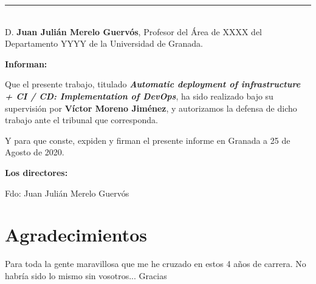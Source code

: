 \noindent\rule[-1ex]{\textwidth}{2pt}\\[4.5ex]

D. \textbf{Juan Julián Merelo Guervós}, Profesor del Área de XXXX del Departamento YYYY de la Universidad de Granada.


\vspace{0.5cm}

\textbf{Informan:}

\vspace{0.5cm}

Que el presente trabajo, titulado \textit{\textbf{Automatic deployment of infrastructure + CI / CD: Implementation of DevOps}},
ha sido realizado bajo su supervisión por \textbf{Víctor Moreno Jiménez}, y autorizamos la defensa de dicho trabajo ante el tribunal
que corresponda.

\vspace{0.5cm}

Y para que conste, expiden y firman el presente informe en Granada a 25 de Agosto de 2020.

\vspace{1cm}

\textbf{Los directores:}

\vspace{5cm}
\noindent Fdo: Juan Julián Merelo Guervós



\chapter*{Agradecimientos}
\thispagestyle{empty}

       \vspace{1cm}


Para toda la gente maravillosa que me he cruzado en estos 4 años de carrera. No habría sido lo mismo sin vosotros... Gracias

